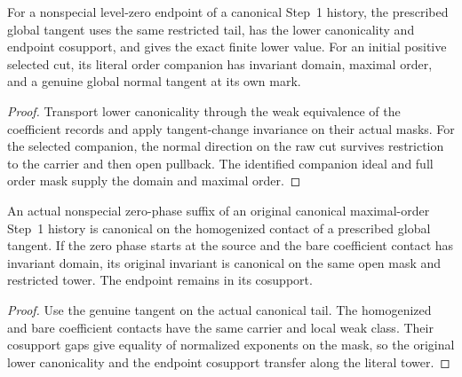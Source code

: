 \begin{theorem}
\label{hir:g1-prescribed-zero-contact-value}
\leanok
For a nonspecial level-zero endpoint of a canonical Step~1 history,
the prescribed global tangent uses the same restricted tail,
has the lower canonicality and endpoint cosupport, and gives the exact
finite lower value. For an initial positive selected cut, its literal
order companion has invariant domain, maximal order, and a genuine
global normal tangent at its own mark.
\end{theorem}
\begin{proof}
Transport lower canonicality through the weak equivalence of the
coefficient records and apply tangent-change invariance on their
actual masks. For the selected companion, the normal direction on the
raw cut survives restriction to the carrier and then open pullback.
The identified companion ideal and full order mask supply the domain
and maximal order.
\end{proof}

\begin{theorem}
\label{hir:g1-initial-zero-bare-contact-canonical}
\leanok
An actual nonspecial zero-phase suffix of an original canonical
maximal-order Step~1 history is canonical on the homogenized
contact of a prescribed global tangent. If the zero phase starts
at the source and the bare coefficient contact has invariant
domain, its original invariant is canonical on the same open
mask and restricted tower. The endpoint remains in its cosupport.
\end{theorem}
\begin{proof}
Use the genuine tangent on the actual canonical tail. The
homogenized and bare coefficient contacts have the same carrier
and local weak class. Their cosupport gaps give equality of
normalized exponents on the mask, so the original lower canonicality
and the endpoint cosupport transfer along the literal tower.
\end{proof}

